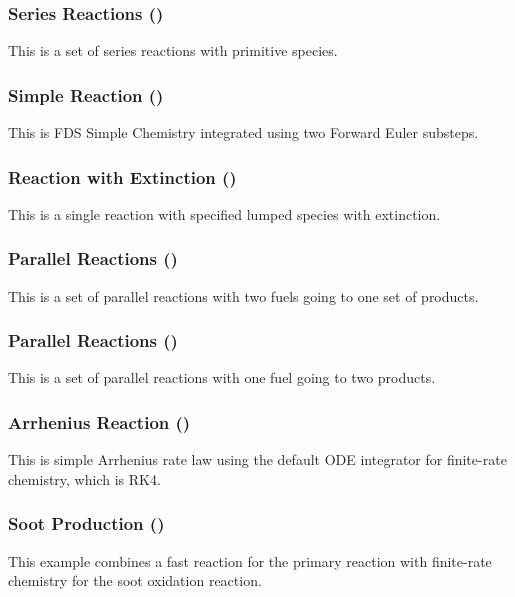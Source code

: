 \documentclass[11pt]{book}
\begin{document}
\subsubsection{Series Reactions ()} This is a set of series reactions with primitive species.

\subsubsection{Simple Reaction ()} This is FDS Simple Chemistry integrated using two Forward Euler substeps.

\subsubsection{Reaction with Extinction ()} This is a single reaction with specified lumped species with extinction.

\subsubsection{Parallel Reactions ()} This is a set of parallel reactions with two fuels going to one set of products.

\subsubsection{Parallel Reactions ()} This is a set of parallel reactions with one fuel going to two products.

\subsubsection{Arrhenius Reaction ()} This is simple Arrhenius rate law using the default ODE integrator for finite-rate chemistry, which is RK4.

\subsubsection{Soot Production ()} This example combines a fast reaction for the primary reaction with finite-rate chemistry for the soot oxidation reaction.
\end{document}

